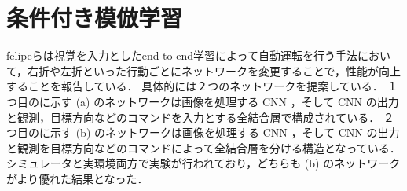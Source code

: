 \section{条件付き模倣学習}
felipeらは視覚を入力としたend-to-end学習によって自動運転を行う手法において，右折や左折といった行動ごとにネットワークを変更することで，性能が向上することを報告している．
具体的には２つのネットワークを提案している．
１つ目の\figref{}に示す (a) のネットワークは画像を処理する CNN ，そして CNN の出力と観測，目標方向などのコマンドを入力とする全結合層で構成されている．
２つ目の\figref{}に示す (b) のネットワークは画像を処理する CNN ，そして CNN の出力と観測を目標方向などのコマンドによって全結合層を分ける構造となっている．
シミュレータと実環境両方で実験が行われており，どちらも (b) のネットワークがより優れた結果となった．